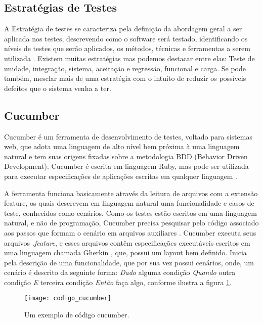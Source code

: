 \documentclass[12pt]{article}
\begin{document}
	\subsection{Estratégias de Testes}
	A Estratégia de testes se caracteriza pela definição da abordagem geral a ser aplicada nos testes, descrevendo como o software será testado, identificando os níveis de testes que serão aplicados, os métodos, técnicas e ferramentas a serem utilizada \cite{rios2006teste}. Existem muitas estratégias mas podemos destacar entre elas: Teste de unidade, integração, sistema, aceitação e regressão, funcional e carga. Se pode também, mesclar mais de uma estratégia com o intuito de reduzir os possíveis defeitos que o sistema venha a ter.	

	\subsection{Cucumber}
	Cucumber é um ferramenta de desenvolvimento de testes, voltado para sistemas web, que adota uma linguagem de alto nível bem próxima à uma linguagem natural e tem suas origens fixadas sobre a metodologia BDD (Behavior Driven Development). Cucumber é escrita em linguagem Ruby, mas pode ser utilizada para executar especificações de aplicações escritas em qualquer linguagem \cite{nunescucumber}. 

	A ferramenta funciona basicamente através da leitura de arquivos com a extensão feature, os quais descrevem em linguagem natural uma funcionalidade e casos de teste, conhecidos como cenários.     
	Como os testes estão escritos em uma linguagem natural, e não de programação, Cucumber precisa pesquisar pelo código associado aos passos que formam o cenário em arquivos auxiliares \cite{scmitzcucumberreview}. Cucumber executa seus arquivos \emph{.feature}, e esses arquivos contêm especificações executáveis escritos em uma linguagem chamada Gherkin \cite{cucumberwiki}, que, possui um layout bem definido. Inicia pela descrição de uma funcionalidade, que por sua vez possui cenários, onde, um cenário é descrito da seguinte forma: \emph{Dado} alguma condição \emph{Quando} outra condição \emph{E} terceira condição \emph{Então} faça algo, conforme ilustra a figura \ref{fig:codigo_cucumber}.

	\begin{figure}[!htb]
		\centering
		\texttt{[image: codigo\_cucumber]}
		\caption{Um exemplo de código cucumber.}
		\label{fig:codigo_cucumber}
	\end{figure}
\end{document}
